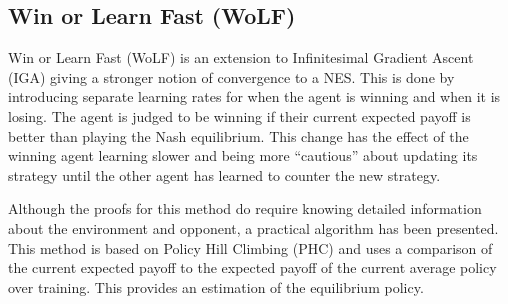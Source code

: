 \documentclass[conference]{IEEEtran}
\begin{document}

\subsection{Win or Learn Fast (WoLF)}

Win or Learn Fast (WoLF) is an extension to Infinitesimal Gradient Ascent (IGA)\cite{singh2000nash} giving a stronger notion of convergence to a NES. This is done by introducing separate learning rates for when the agent is winning and when it is losing. The agent is judged to be winning if their current expected payoff is better than playing the Nash equilibrium. This change has the effect of the winning agent learning slower and being more ``cautious'' about updating its strategy until the other agent has learned to counter the new strategy.


Although the proofs for this method do require knowing detailed information about the environment and opponent, a practical algorithm has been presented\cite{bowling2002multiagent}. This method is based on Policy Hill Climbing (PHC) and uses a comparison of the current expected payoff to the expected payoff of the current average policy over training. This provides an estimation of the equilibrium policy.
\end{document}
